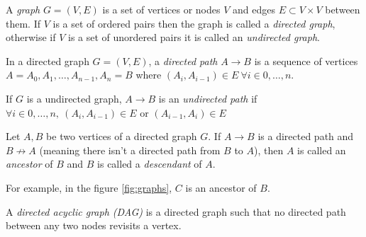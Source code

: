 
\begin{definition}
A \emph{graph} \(G = (V,E)\) is a set of vertices or nodes \(V\) and edges \(E\subset
V\times V\) between them.
If \(V\) is a set of ordered pairs then the graph is called a \emph{directed
  graph}, otherwise if \(V\) is a set of unordered pairs it is called an \emph{undirected graph}.
\end{definition}

\begin{figure*}[h]
\centering
{}
\caption{Example of directed and undirected graph, respectively.}
\label{fig:graphs}
\end{figure*}

\begin{definition}
In a directed graph \(G = (V, E)\), a \emph{directed path} \(A \to B\) is a sequence of vertices \({A = A_0,
  A_1,\dots,A_{n-1}, A_n = B}\) where \((A_i, A_{i-1}) \in E \ \forall i \in
0,\dots ,n\).

If \(G\) is a undirected graph, \(A \to B\) is an \emph{undirected path} if \(\forall i \in
0,\dots, n, \ (A_i, A_{i-1}) \in E\) or  \((A_{i-1}, A_{i}) \in E\)
\end{definition}

\begin{definition}
Let \(A,B\) be two vertices of a directed graph \(G\). If \(A \to B\) is a
directed path and \(B \not \to A\) (meaning there isn't a directed path from
\(B\) to \(A\)), then \(A\) is called an \emph{ancestor} of \(B\) and \(B\) is called a \emph{descendant} of \(A\).
\end{definition}

For example, in the figure \ref{fig:graphs}, \(C\) is an ancestor of \(B\).

\begin{definition}
A \emph{directed acyclic graph (DAG)} is a directed graph such that no directed path between any two nodes revisits a vertex.
\end{definition}


